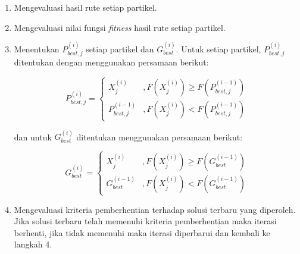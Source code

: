 {{\begin{enumerate}[align = left, left = 0cm, nolistsep]
        \item Mengevaluasi hasil rute setiap partikel.
        \item Mengevaluasi nilai fungsi \textit{fitness} hasil rute setiap partikel.
        \item Menentukan $P_{best,j}^{(i)}$ setiap partikel dan $G_{best}^{(i)}$. Untuk setiap partikel, $P_{best,j}^{(i)}$ ditentukan dengan menggunakan persamaan berikut:

              \begin{equation}
                  P_{best,j}^{(i)} = \begin{cases} X_{j}^{(i)} & , F(X_{j}^{(i)}) \geq F(P_{best,j}^{(i-1)}) \\ P_{best,j}^{(i-1)} &, F(X_{j}^{(i)}) < F(P_{best,j}^{(i-1)}) \end{cases}
              \end{equation}

              dan untuk $G_{best}^{(i)}$ ditentukan menggunakan persamaan berikut:

              \begin{equation}
                  G_{best}^{(i)} = \begin{cases} X_{j}^{(i)} & , F(X_{j}^{(i)}) \geq F(G_{best}^{(i-1)}) \\ G_{best}^{(i-1)} &, F(X_{j}^{(i)}) < F(G_{best}^{(i-1)}) \end{cases}
              \end{equation}

        \item Mengevaluasi kriteria pemberhentian terhadap solusi terbaru yang diperoleh. Jika solusi terbaru telah memenuhi kriteria pemberhentian maka iterasi berhenti, jika tidak memenuhi maka iterasi diperbarui dan kembali ke langkah 4.
    \end{enumerate}

}

}
\vspace{-3mm}

